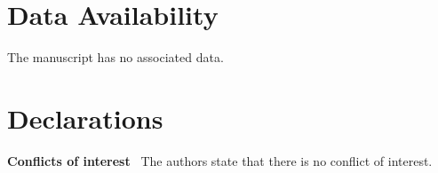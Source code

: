 \documentclass[11pt,reqno,UTF8,twoside]{amsart}
\theoremstyle{definition}
\numberwithin{equation}{section}
\begin{document}

\section*{Data Availability}
		The manuscript has no associated data.
		\section*{Declarations}
		{\bf Conflicts of interest} \ The authors  state  that there is no conflict of interest.
\end{document}
